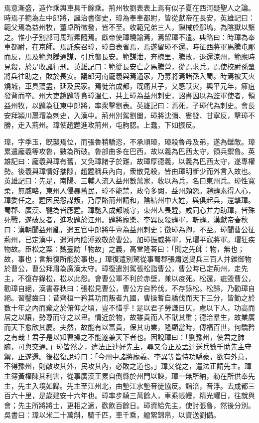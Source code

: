 \begin{pinyinscope}
焉意漸盛，造作乘輿車具千餘乘。荊州牧劉表表上焉有似子夏在西河疑聖人之論。時焉子範為左中郎將，誕治書御史，璋為奉車都尉，皆從獻帝在長安，英雄記曰：範父焉為益州牧，董卓所徵發，皆不至。收範兄弟三人，鏁械於郿塢，為陰獄以繫之。惟小子別部司馬瑁素隨焉。獻帝使璋曉諭焉，焉留璋不遣。典略曰：時璋為奉車都尉，在京師。焉託疾召璋，璋自表省焉，焉遂留璋不還。時征西將軍馬騰屯郿而反，焉及範與騰通謀，引兵襲長安。範謀泄，奔槐里，騰敗，退還涼州，範應時見殺，於是收誕行刑。英雄記曰：範從長安亡之馬騰營，從焉求兵。焉使校尉孫肇將兵往助之，敗於長安。議郎河南龐羲與焉通家，乃募將焉諸孫入蜀。時焉被天火燒城，車具蕩盡，延及民家。焉徙治成都，旣痛其子，又感祅灾，興平元年，癕疽發背而卒。州大吏趙韙等貪璋溫仁，共上璋為益州刺史，詔書因以為監軍使者，領益州牧，以韙為征東中郎將，率衆擊劉表。英雄記曰：焉死，子璋代為刺史。會長安拜潁川扈瑁為刺史，入漢中。荊州別駕劉闔，璋將沈彌、婁發、甘寧反，擊璋不勝，走入荊州。璋使趙韙進攻荊州，屯朐䏰。上蠢，下如振反。

璋，字季玉，旣襲焉位，而張魯稍驕恣，不承順璋，璋殺魯母及弟，遂為讎敵。璋累遣龐羲等攻魯，數為所破。魯部曲多在巴西，故以羲為巴西太守，領兵禦魯。英雄記曰：龐羲與璋有舊，又免璋諸子於難，故璋厚德羲，以羲為巴西太守，遂專權勢。後羲與璋情好攜隙，趙韙稱兵內向，衆散見殺，皆由璋明斷少而外言入故也。英雄記曰：先是，南陽、三輔人流入益州數萬家，收以為兵，名曰東州兵。璋性寬柔，無威略，東州人侵暴舊民，璋不能禁，政令多闕，益州頗怨。趙韙素得人心，璋委任之。韙因民怨謀叛，乃厚賂荊州請和，陰結州中大姓，與俱起兵，還擊璋。蜀郡、廣漢、犍為皆應韙。璋馳入成都城守，東州人畏韙，咸同心并力助璋，皆殊死戰，遂破反者，進攻韙於江州。韙將龐樂、李異反殺韙軍，斬韙。漢獻帝春秋曰：漢朝聞益州亂，遣五官中郎將牛亶為益州刺史；徵璋為卿，不至。璋聞曹公征荊州，已定漢中，遣河內陰溥致敬於曹公。加璋振威將軍，兄瑁平寇將軍。瑁狂疾物故。臣松之案：魏臺訪「物故」之義，高堂隆荅曰：「聞之先師：物，無也；故，事也；言無復所能於事也。」璋復遣別駕從事蜀郡張肅送叟兵三百人并雜御物於曹公，曹公拜肅為廣漢太守。璋復遣別駕張松詣曹公，曹公時已定荊州，走先主，不復存錄松，松以此怨。會曹公軍不利於赤壁，兼以疫死。松還，疵毀曹公，勸璋自絕，漢書春秋曰：張松見曹公，曹公方自矜伐，不存錄松。松歸，乃勸璋自絕。習鑿齒曰：昔齊桓一矜其功而叛者九國，曹操暫自驕伐而天下三分，皆勤之於數十年之內而棄之於俯仰之頃，豈不惜乎！是以君子勞謙日仄，慮以下人，功高而居之以讓，勢尊而守之以卑。情近於物，故雖貴而人不猒其重；德洽羣生，故業廣而天下愈欣其慶。夫然，故能有以富貴，保其功業，隆顯當時，傳福百世，何驕矜之有哉！君子是以知曹操之不能遂兼天下者也。因說璋曰：「劉豫州，使君之肺腑，可與交通。」璋皆然之，遣法正連好先主，尋又令正及孟達送兵數千助先主守禦，正遂還。後松復說璋曰：「今州中諸將龐羲、李異等皆恃功驕豪，欲有外意，不得豫州，則敵攻其外，民攻其內，必敗之道也。」璋又從之，遣法正請先主。璋主簿黃權陳其利害，從事廣漢王累自倒縣於州門以諫，璋一無所納，勑在所供奉先主，先主入境如歸。先主至江州北，由墊江水墊音徒協反。詣涪，音浮。去成都三百六十里，是歲建安十六年也。璋率步騎三萬餘人，車乘帳幔，精光耀日，往就與會；先主所將將士，更相之適，歡飲百餘日。璋資給先主，使討張魯，然後分別。吳書曰：璋以米二十萬斛，騎千匹，車千乘，繒絮錦帛，以資送劉備。


\end{pinyinscope}
